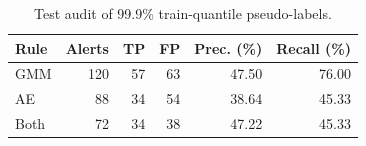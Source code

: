 \begin{table}[H]
\centering\footnotesize\setlength{\tabcolsep}{3pt}
\caption{Test audit of 99.9\% train-quantile pseudo-labels.}
\label{tab:pseudo}
\begin{tabular}{@{}lrrrrr@{}}
\toprule
Rule & Alerts & TP & FP & Prec. (\%) & Recall (\%) \\
\midrule
GMM & 120 & 57 & 63 & 47.50 & 76.00 \\
AE & 88 & 34 & 54 & 38.64 & 45.33 \\
Both & 72 & 34 & 38 & 47.22 & 45.33 \\
\bottomrule
\end{tabular}
\end{table}
